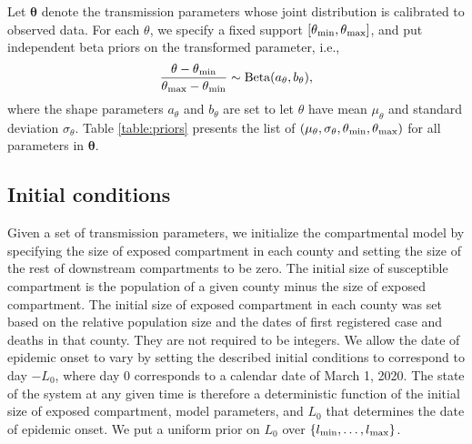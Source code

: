\documentclass[11pt]{article}
\newcommand{\btheta}{\boldsymbol{\theta}}
\begin{document}
Let $\btheta$ denote the transmission parameters whose joint distribution is calibrated to observed data. For each $\theta$, we specify a fixed support $[\theta\textsubscript{min}, \theta\textsubscript{max}]$, and put independent beta priors on the transformed parameter, i.e.,
\begin{equation}
\frac{\theta - \theta\textsubscript{min}}{\theta\textsubscript{max} - \theta\textsubscript{min}} \sim \mbox{Beta}(a_{\theta}, b_{\theta}),
\label{eq:truncdist}
\end{equation}    
where the shape parameters $a_{\theta}$ and $b_\theta$ are set to let $\theta$ have mean $\mu_\theta$ and standard deviation $\sigma_\theta$. Table \ref{table:priors} presents the list of $(\mu_\theta, \sigma_\theta, \theta\textsubscript{min}, \theta\textsubscript{max})$ for all parameters in $\btheta$. 


\subsection{Initial conditions} %
Given a set of transmission parameters, we initialize the compartmental model by specifying the size of exposed compartment in each county and setting the size of the rest of downstream compartments to be zero. The initial size of susceptible compartment is the population of a given county minus the size of exposed compartment. The initial size of exposed compartment in each county was set based on the relative population size and the dates of first registered case and deaths in that county. They are not required to be integers. 
We allow the date of epidemic onset to vary by setting the described initial conditions to correspond to day $-L_0$, where day $0$ corresponds to a calendar date of March 1, 2020. 
The state of the system at any given time is therefore a deterministic function of the initial size of exposed compartment, model parameters, and $L_0$ that determines the date of epidemic onset. We put a uniform prior on $L_{0}$ over $\{l\textsubscript{min}, \ldots, l\textsubscript{max}\}$.
\end{document}
